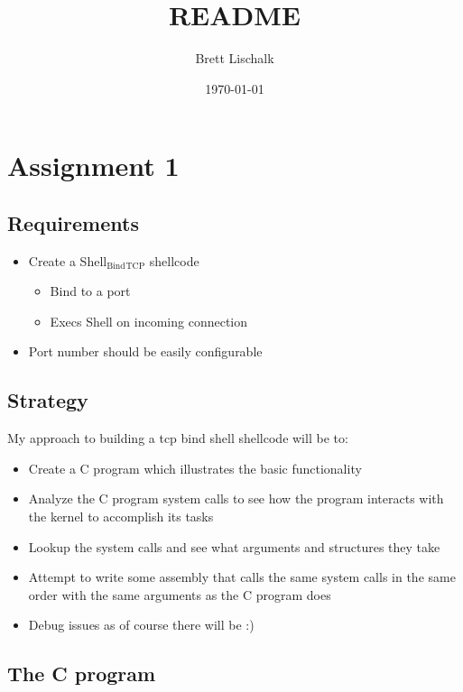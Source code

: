 \documentclass[11pt]{article}
\author{Brett Lischalk}
\date{\today}
\title{README}
\begin{document}
\maketitle
\tableofcontents

\section{Assignment 1}
\label{sec-1}

\subsection{Requirements}
\label{sec-1-1}

\begin{itemize}
\item Create a Shell$_{\text{Bind}}$$_{\text{TCP}}$ shellcode
\begin{itemize}
\item Bind to a port
\item Execs Shell on incoming connection
\end{itemize}
\item Port number should be easily configurable
\end{itemize}

\subsection{Strategy}
\label{sec-1-2}

My approach to building a tcp bind shell shellcode will be to:

\begin{itemize}
\item Create a C program which illustrates the basic functionality
\item Analyze the C program system calls to see how the program interacts with the kernel to accomplish its tasks
\item Lookup the system calls and see what arguments and structures they take
\item Attempt to write some assembly that calls the same system calls in the same order with the same arguments as the C program does
\item Debug issues as of course there will be :)
\end{itemize}

\subsection{The C program}
\label{sec-1-3}
\end{document}
